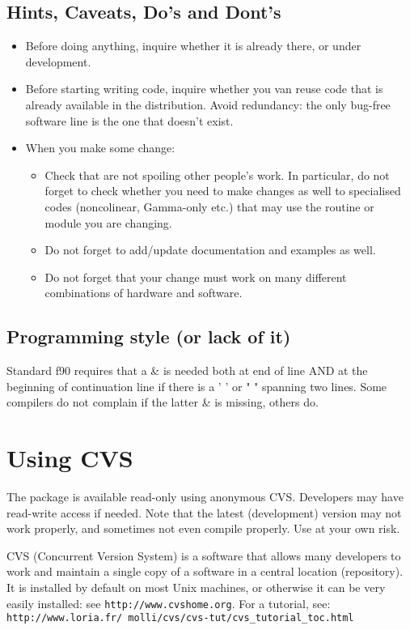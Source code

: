\documentclass[12pt]{article}
\begin{document}
\subsection{Hints, Caveats, Do's and Dont's}
\begin{itemize}
\item
Before doing anything, inquire whether it is already there,
or under development.
\item 
Before starting writing code, inquire whether you van reuse
code that is already available in the distribution. Avoid 
redundancy: the only bug-free software line is the one that 
doesn't exist.
\item When you make some change:
\begin{itemize}
\item Check that are not spoiling other people's work.
In particular, do not forget to check whether you need to make changes 
as well to specialised codes (noncolinear, Gamma-only etc.) that may
use the routine or module you are changing.
\item Do not forget to add/update documentation and examples as well.
\item Do not forget that your change must work on many different 
combinations of hardware and software.
\end{itemize}
\end{itemize}
\subsection{Programming style (or lack of it)}

Standard f90 requires that a \& is needed both at end of line 
AND at the beginning of continuation line if there is a ' ' 
or " " spanning two lines. Some compilers do not complain
if the latter \& is missing, others do.

\section{Using CVS}

The package is available read-only using anonymous CVS. Developers 
may have read-write access if needed. Note that the latest
(development) version may not work properly, and sometimes not 
even compile properly. Use at your own risk.

CVS (Concurrent Version System) is a software that allows many
developers to work and maintain a single copy of a software in
a central location (repository). It is installed by default on
most Unix machines, or otherwise it can be very easily installed:
see {\tt http://www.cvshome.org}. For a tutorial, see:\\
{\tt http://www.loria.fr/~{}molli/cvs/cvs-tut/cvs\_tutorial\_toc.html}
\end{document}
